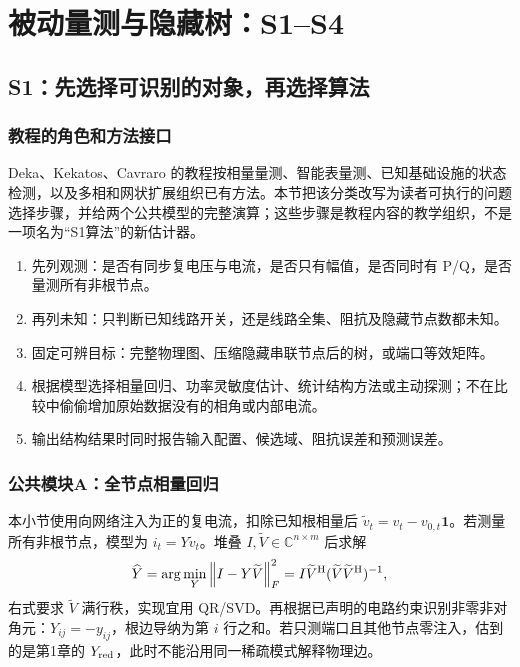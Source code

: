 \chapter{被动量测与隐藏树：S1--S4}
\label{ch:passive}
\section{S1：先选择可识别的对象，再选择算法}
\subsection{教程的角色和方法接口}
Deka、Kekatos、Cavraro 的教程\citep{S1}按相量量测、智能表量测、已知基础设施的状态检测，以及多相和网状扩展组织已有方法。本节把该分类改写为读者可执行的问题选择步骤，并给两个公共模型的完整演算；这些步骤是教程内容的教学组织，不是一项名为“S1算法”的新估计器。

\begin{enumerate}
\item 先列观测：是否有同步复电压与电流，是否只有幅值，是否同时有 P/Q，是否量测所有非根节点。
\item 再列未知：只判断已知线路开关，还是线路全集、阻抗及隐藏节点数都未知。
\item 固定可辨目标：完整物理图、压缩隐藏串联节点后的树，或端口等效矩阵。
\item 根据模型选择相量回归、功率灵敏度估计、统计结构方法或主动探测；不在比较中偷偷增加原始数据没有的相角或内部电流。
\item 输出结构结果时同时报告输入配置、候选域、阻抗误差和预测误差。
\end{enumerate}

\subsection{公共模块A：全节点相量回归}
本小节使用向网络注入为正的复电流，扣除已知根相量后 $\widetilde v_t=v_t-v_{0,t}\mathbf1$。若测量所有非根节点，模型为 $i_t=Y\widetilde v_t$。堆叠 $I,\widetilde V\in\mathbb C^{n\times m}$ 后求解
\begin{equation}
 \widehat Y=\arg\min_Y\left\lVert I-Y\widetilde V\right\rVert_F^2
 =I\widetilde V^{\mathrm H}(\widetilde V\widetilde V^{\mathrm H})^{-1},
 \label{eq:tb-phasor-ls}
\end{equation}
右式要求 $\widetilde V$ 满行秩，实现宜用 QR/SVD。再根据已声明的电路约束识别非零非对角元：$Y_{ij}=-y_{ij}$，根边导纳为第 $i$ 行之和。若只测端口且其他节点零注入，估到的是第1章的 $Y_{\rm red}$，此时不能沿用同一稀疏模式解释物理边。


